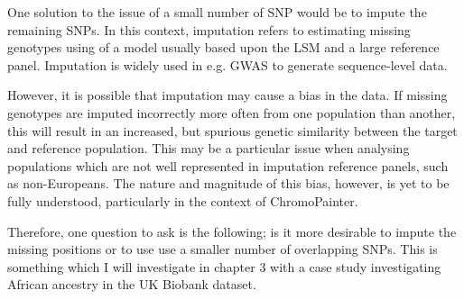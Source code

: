 One solution to the issue of a small number of SNP would be to impute the remaining SNPs. In this context, imputation refers to estimating missing genotypes using of a model usually based upon the LSM and a large reference panel. Imputation is widely used in e.g. GWAS to generate sequence-level data.

However, it is possible that imputation may cause a bias in the data. If missing genotypes are imputed incorrectly more often from one population than another, this will result in an increased, but spurious genetic similarity between the target and reference population. This may be a particular issue when analysing populations which are not well represented in imputation reference panels, such as non-Europeans. The nature and magnitude of this bias, however, is yet to be fully understood, particularly in the context of ChromoPainter.  

Therefore, one question to ask is the following; is it more desirable to impute the missing positions or to use use a smaller number of overlapping SNPs. This is something which I will investigate in chapter 3 with a case study investigating African ancestry in the UK Biobank dataset. 
 
